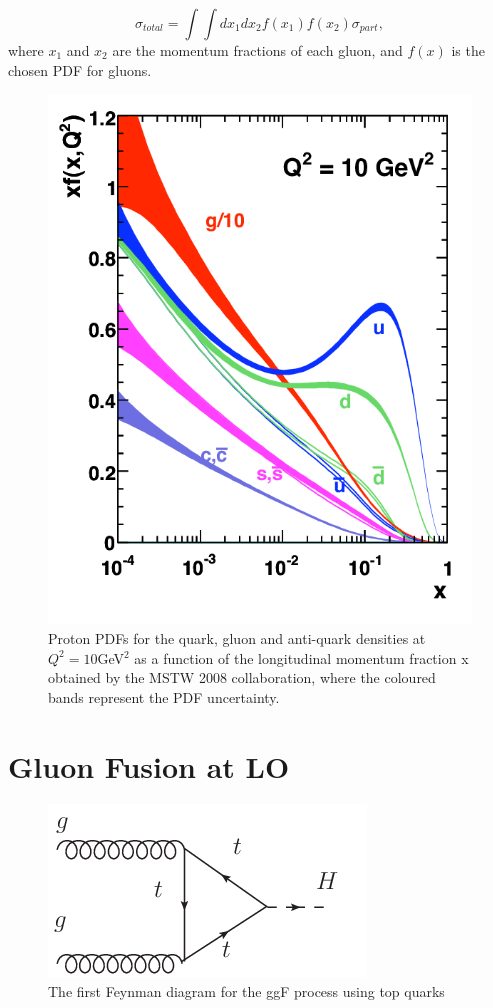 \documentclass[EPJ,twocolumn]{webofc}
\begin{document}
\begin{equation}
    \sigma_{total} = \int\int dx_1dx_2 f\left(x_1\right)f\left(x_2\right)\sigma_{part},
\end{equation}
where $x_1$ and $x_2$ are the momentum fractions of each gluon, and $f(x)$ is the chosen PDF for gluons.



\begin{figure}[t]
    \centering
    \includegraphics[width=.5\columnwidth]{Images/PDF.png}
  \center  \caption{Proton PDFs for the quark, gluon and anti-quark densities at $Q^2 = 10$GeV$^2$ as a function of the longitudinal momentum fraction x obtained by the MSTW 2008 collaboration, where the coloured bands represent the PDF uncertainty.}
    \label{PDF}
\end{figure}



\section{\label{sec3}Gluon Fusion at LO}

\begin{figure}[ht]
    \centering
    \includegraphics[width=.5\columnwidth]{Images/ggFDiagram.png}
    \caption{The first Feynman diagram for the ggF process using top quarks}
    \label{ggF diagram}
\end{figure}
\end{document}
